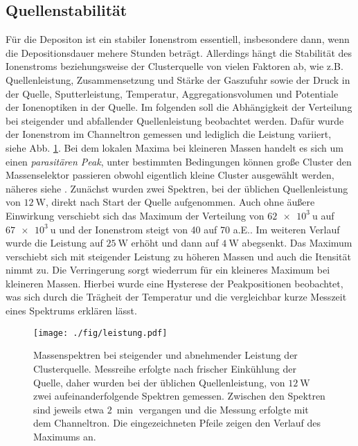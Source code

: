 \subsection{Quellenstabilität}
\label{sec:leistung}
Für die Depositon ist ein stabiler Ionenstrom essentiell, insbesondere dann, wenn die Depositionsdauer mehere Stunden beträgt.
Allerdings hängt die Stabilität des Ionenstroms beziehungsweise der Clusterquelle von vielen Faktoren ab, wie z.B. Quellenleistung, Zusammensetzung und Stärke der Gaszufuhr sowie der Druck in der Quelle, Sputterleistung, Temperatur, Aggregationsvolumen und Potentiale der Ionenoptiken in der Quelle.
Im folgenden soll die Abhängigkeit der Verteilung bei steigender und abfallender Quellenleistung beobachtet werden.
Dafür wurde der Ionenstrom im Channeltron gemessen und lediglich die Leistung variiert, siehe Abb. \ref{fig:leistung}.
Bei dem lokalen Maxima bei kleineren Massen handelt es sich um einen \textit{parasitären Peak}, unter bestimmten Bedingungen können große Cluster den Massenselektor passieren obwohl eigentlich kleine Cluster ausgewählt werden, näheres siehe \cite{gust}.
Zunächst wurden zwei Spektren, bei der üblichen Quellenleistung von $\SI{12}{\watt}$, direkt nach Start der Quelle aufgenommen. 
Auch ohne äußere Einwirkung verschiebt sich das Maximum der Verteilung von $\SI{62e3}{\amu}$ auf $\SI{67e3}{\amu}$ und der Ionenstrom steigt von 40 auf 70 a.E..
Im weiteren Verlauf wurde die Leistung auf $\SI{25}{\watt}$ erhöht und dann auf $\SI{4}{\watt}$ abegsenkt.
Das Maximum verschiebt sich mit steigender Leistung zu höheren Massen und auch die Itensität nimmt zu.
Die Verringerung sorgt wiederrum für ein kleineres Maximum bei kleineren Massen.
Hierbei wurde eine Hysterese der Peakpositionen beobachtet, was sich durch die Trägheit der Temperatur und die vergleichbar kurze Messzeit eines Spektrums erklären lässt.

\begin{figure}
  \centering
  \texttt{[image: ./fig/leistung.pdf]}
  \caption{Massenspektren bei steigender und abnehmender Leistung der Clusterquelle. Messreihe erfolgte nach frischer Einkühlung der Quelle, daher wurden bei der üblichen Quellenleistung, von $\SI{12}{\watt}$ zwei aufeinanderfolgende Spektren gemessen. Zwischen den Spektren sind jeweils etwa $\SI{2}{\min}$ vergangen und die Messung erfolgte mit dem Channeltron. Die eingezeichneten Pfeile zeigen den Verlauf des Maximums an.}
  \label{fig:leistung}
\end{figure}
